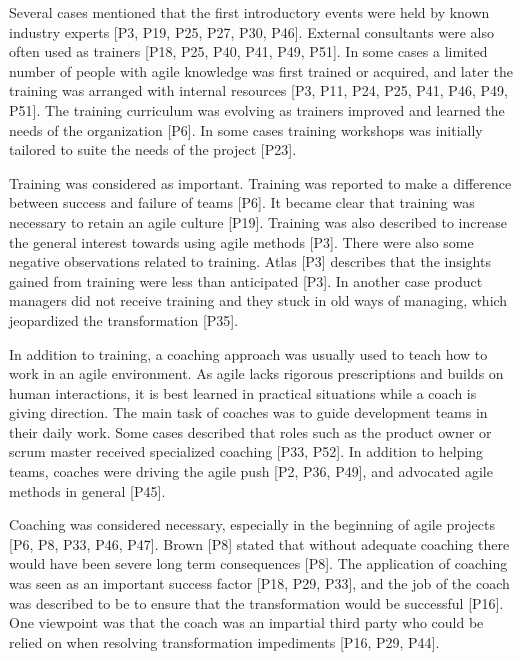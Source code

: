 \documentclass[preprint,authoryear,12pt]{elsarticle}
\begin{document}
Several cases mentioned that the first introductory events were held by known
industry experts [P3, P19, P25, P27, P30, P46]. External consultants were also
often used as trainers [P18, P25, P40, P41, P49, P51]. In some cases a limited
number of people with agile knowledge was first trained or acquired, and later
the training was arranged with internal resources [P3, P11, P24, P25, P41, P46,
P49, P51].
The training curriculum was evolving as trainers improved and learned the needs
of the organization [P6]. In some cases training workshops was initially
tailored to suite the needs of the project [P23].

Training was considered as important. Training was reported to make a difference
between success and failure of teams [P6].
It became clear that training was necessary to retain an agile culture [P19].
Training was also described to increase the general interest towards using agile
methods [P3].
There were also some negative observations related to training. Atlas [P3]
describes that the insights gained from training were less than anticipated
[P3]. In another case product managers did not receive training and they stuck
in old ways of managing, which jeopardized the transformation [P35].



In addition to training, a coaching approach was usually used to teach how to
work in an agile environment. As agile lacks rigorous prescriptions and builds
on human interactions, it is best learned in practical situations while a coach
is giving direction.
The main task of coaches was to guide development teams in their daily work.
Some cases described that roles such as the product owner or scrum master
received specialized coaching [P33, P52].
In addition to helping teams, coaches were driving the agile push [P2, P36,
P49], and advocated agile methods in general [P45].

Coaching was considered necessary, especially in the beginning of agile projects
[P6, P8, P33, P46, P47]. Brown [P8] stated that without adequate coaching there
would have been severe long term consequences [P8]. The application of coaching
was seen as an important success factor [P18, P29, P33], and the job of the
coach was described to be to ensure that the transformation would be successful
[P16]. One viewpoint was that the coach was an impartial third party who could
be relied on when resolving transformation impediments [P16, P29, P44].
\end{document}
